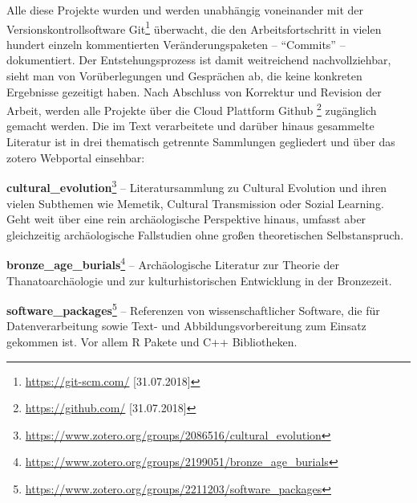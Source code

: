 \documentclass[openany,twoside,twocolumn]{book}
\let\rmarkdownfootnote\footnote%
\def\footnote{\protect\rmarkdownfootnote}
\begin{document}
Alle diese Projekte wurden und werden unabhängig voneinander mit der
Versionskontrollsoftware Git\footnote{\url{https://git-scm.com/}
  {[}31.07.2018{]}} überwacht, die den Arbeitsfortschritt in vielen
hundert einzeln kommentierten Veränderungspaketen -- ``Commits'' --
dokumentiert. Der Entstehungsprozess ist damit weitreichend
nachvollziehbar, sieht man von Vorüberlegungen und Gesprächen ab, die
keine konkreten Ergebnisse gezeitigt haben. Nach Abschluss von Korrektur
und Revision der Arbeit, werden alle Projekte über die Cloud Plattform
Github \footnote{\url{https://github.com/} {[}31.07.2018{]}} zugänglich
gemacht werden. Die im Text verarbeitete und darüber hinaus gesammelte
Literatur ist in drei thematisch getrennte Sammlungen gegliedert und
über das zotero Webportal einsehbar:

\textbf{cultural\_evolution}\footnote{\url{https://www.zotero.org/groups/2086516/cultural_evolution}}
-- Literatursammlung zu Cultural Evolution und ihren vielen Subthemen
wie Memetik, Cultural Transmission oder Sozial Learning. Geht weit über
eine rein archäologische Perspektive hinaus, umfasst aber gleichzeitig
archäologische Fallstudien ohne großen theoretischen Selbstanspruch.

\textbf{bronze\_age\_burials}\footnote{\url{https://www.zotero.org/groups/2199051/bronze_age_burials}}
-- Archäologische Literatur zur Theorie der Thanatoarchäologie und zur
kulturhistorischen Entwicklung in der Bronzezeit.

\textbf{software\_packages}\footnote{\url{https://www.zotero.org/groups/2211203/software_packages}}
-- Referenzen von wissenschaftlicher Software, die für Datenverarbeitung
sowie Text- und Abbildungsvorbereitung zum Einsatz gekommen ist. Vor
allem R Pakete und C++ Bibliotheken.
\end{document}
